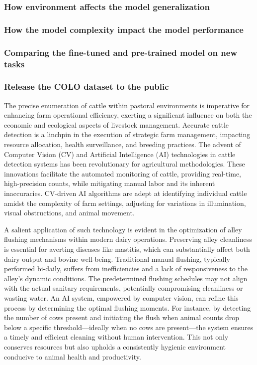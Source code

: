 \subsubsection*{How environment affects the model generalization}

\subsubsection*{How the model complexity impact the model performance}

\subsubsection*{Comparing the fine-tuned and pre-trained model on new tasks}

\subsubsection*{Release the COLO dataset to the public}




The precise enumeration of cattle within pastoral environments is imperative for enhancing farm operational efficiency, exerting a significant influence on both the economic and ecological aspects of livestock management. Accurate cattle detection is a linchpin in the execution of strategic farm management, impacting resource allocation, health surveillance, and breeding practices. The advent of Computer Vision (CV) and Artificial Intelligence (AI) technologies in cattle detection systems has been revolutionary for agricultural methodologies. These innovations facilitate the automated monitoring of cattle, providing real-time, high-precision counts, while mitigating manual labor and its inherent inaccuracies. CV-driven AI algorithms are adept at identifying individual cattle amidst the complexity of farm settings, adjusting for variations in illumination, visual obstructions, and animal movement.

A salient application of such technology is evident in the optimization of alley flushing mechanisms within modern dairy operations. Preserving alley cleanliness is essential for averting diseases like mastitis, which can substantially affect both dairy output and bovine well-being. Traditional manual flushing, typically performed bi-daily, suffers from inefficiencies and a lack of responsiveness to the alley's dynamic conditions. The predetermined flushing schedules may not align with the actual sanitary requirements, potentially compromising cleanliness or wasting water. An AI system, empowered by computer vision, can refine this process by determining the optimal flushing moments. For instance, by detecting the number of cows present and initiating the flush when animal counts drop below a specific threshold—ideally when no cows are present—the system ensures a timely and efficient cleaning without human intervention. This not only conserves resources but also upholds a consistently hygienic environment conducive to animal health and productivity.

